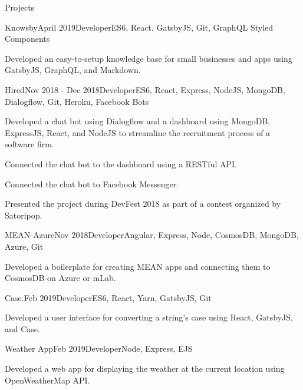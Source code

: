 \documentclass{resume} %
\begin{document}
\begin{rSection}{Projects}

\begin{rSubsection}{Knowsby}{April 2019}{Developer}{ES6, React, GatsbyJS, Git, GraphQL Styled Components}
\item Developed an easy-to-setup knowledge base for small businesses and apps using GatsbyJS, GraphQL, and Markdown.
\end{rSubsection}

\begin{rSubsection}{Hired}{Nov 2018 - Dec 2018}{Developer}{ES6, React, Express, NodeJS, MongoDB, Dialogflow, Git, Heroku, Facebook Bots}
\item Developed a chat bot using Dialogflow and a dashboard using MongoDB, ExpressJS, React, and NodeJS to streamline the recruitment process of a software firm.
\item Connected the chat bot to the dashboard using a RESTful API.
\item Connected the chat bot to Facebook Messenger.
\item Presented the project during DevFest 2018 as part of a contest organized by Satoripop.
\end{rSubsection}

\begin{rSubsection}{MEAN-Azure}{Nov 2018}{Developer}{Angular, Express, Node, CosmosDB, MongoDB, Azure, Git}
\item Developed a boilerplate for creating MEAN apps and connecting them to CosmosDB on Azure or mLab.
\end{rSubsection}

\begin{rSubsection}{Case.}{Feb 2019}{Developer}{ES6, React, Yarn, GatsbyJS, Git}
\item Developed a user interface for converting a string's case using React, GatsbyJS, and Case.
\end{rSubsection}

\begin{rSubsection}{Weather App}{Feb 2019}{Developer}{Node, Express, EJS}
\item Developed a web app for displaying the weather at the current location using OpenWeatherMap API.
\end{rSubsection}

\end{rSection}
\end{document}
